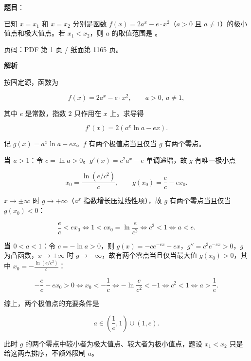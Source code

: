 \begin{answer}

\textbf{题目}：

已知 $x=x_1$ 和 $x=x_2$ 分别是函数 $f(x)=2a^x-e\cdot x^2$（$a>0$ 且 $a\ne1$）的极小值点和极大值点。若 $x_1<x_2$，则 $a$ 的取值范围是 \gkblank{}。

\begin{gktip}
页码：PDF 第 1 页 / 纸面第 1165 页。
\end{gktip}

\textbf{解析}

按固定源，函数为

\nopagebreak[4]
\[
f(x)=2a^x-e\cdot x^2,\qquad a>0,\ a\ne1,
\]

其中 $e$ 是常数，指数 $2$ 只作用在 $x$ 上。求导得

\nopagebreak[4]
\[
f'(x)=2\left(a^x\ln a-ex\right).
\]

记 $g(x)=a^x\ln a-ex$。$f$ 有两个极值点当且仅当 $g$ 有两个零点。

\textbf{当 $a>1$}：令 $c=\ln a>0$。$g'(x)=c^2a^x-e$ 单调递增，故 $g$ 有唯一极小点

\nopagebreak[4]
\[
x_0=\frac{\ln(e/c^2)}{c},\qquad g(x_0)=\frac ec-ex_0.
\]

$x\to\pm\infty$ 时 $g\to+\infty$（$a^x$ 指数增长压过线性项），故 $g$ 有两个零点当且仅当 $g(x_0)<0$：

\nopagebreak[4]
\[
\frac ec<ex_0\iff 1<cx_0=\ln\frac{e}{c^2}\iff c^2<1\iff a<e.
\]

\textbf{当 $0<a<1$}：令 $c=-\ln a>0$，则 $g(x)=-ce^{-cx}-ex$，$g''=c^3e^{-cx}>0$，$g$ 为凸函数，$x\to\pm\infty$ 时 $g\to-\infty$，故有两个零点当且仅当最大值 $g(x_0)>0$，其中 $x_0=-\frac{\ln(e/c^2)}{c}$：

\nopagebreak[4]
\[
-\frac ec-ex_0>0\iff x_0<-\frac1c\iff -\ln\frac{e}{c^2}<-1\iff c^2<1\iff a>\frac1e.
\]

综上，两个极值点的充要条件是

\nopagebreak[4]
\[
a\in\left(\frac1e,1\right)\cup(1,e).
\]

此时 $g$ 的两个零点中较小者为极大值点、较大者为极小值点，题设 $x_1<x_2$ 只是给这两点排序，不额外限制 $a$。


\end{answer}
